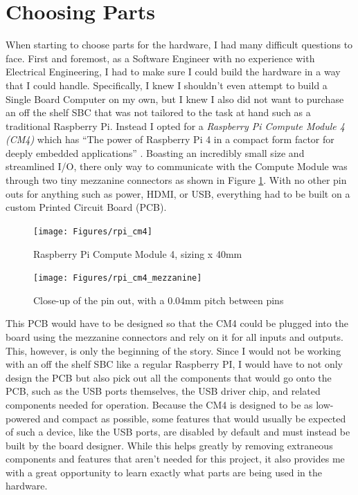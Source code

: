 \section{Choosing Parts}\label{sec:ChoosingParts}

When starting to choose parts for the hardware, I had many difficult questions to face.
First and foremost, as a Software Engineer with no experience with Electrical Engineering, I had to make sure I could build the hardware in a way that I could handle.
Specifically, I knew I shouldn't even attempt to build a Single Board Computer on my own, but I knew I also did not want to purchase an off the shelf SBC that was not tailored to the task at hand such as a traditional Raspberry Pi.
Instead I opted for a \emph{Raspberry Pi Compute Module 4 (CM4)} which has \enquote{The power of Raspberry Pi 4 in a compact form factor for deeply embedded applications} \cite{rpi_cm4}.
Boasting an incredibly small size and streamlined I/O, there only way to communicate with the Compute Module was through two tiny mezzanine connectors as shown in Figure \ref{fig:rpi_cm4_mezzanine}.
With no other pin outs for anything such as power, HDMI, or USB, everything had to be built on a custom Printed Circuit Board (PCB).

\begin{figure}[h]
  \centering
  \begin{minipage}{0.45\textwidth}
    \centering
    \texttt{[image: Figures/rpi\_cm4]}
    \captionsetup{width=.75\linewidth}
    \caption[Raspberry Pi Compute Module 4]{Raspberry Pi Compute Module 4, sizing x 40mm}
    \label{fig:rpi_cm4}
  \end{minipage}\hfill
  \begin{minipage}{0.45\textwidth}
    \centering
    \texttt{[image: Figures/rpi\_cm4\_mezzanine]}
    \captionsetup{width=.75\linewidth}
    \caption[Raspberry Pi Compute Module 4 Pin out]{Close-up of the pin out, with a 0.04mm pitch between pins}
    \label{fig:rpi_cm4_mezzanine}
  \end{minipage}
\end{figure}

This PCB would have to be designed so that the CM4 could be plugged into the board using the mezzanine connectors and rely on it for all inputs and outputs.
This, however, is only the beginning of the story.
Since I would not be working with an off the shelf SBC like a regular Raspberry PI, I would have to not only design the PCB but also pick out all the components that would go onto the PCB, such as the USB ports themselves, the USB driver chip, and related components needed for operation.
Because the CM4 is designed to be as low-powered and compact as possible, some features that would usually be expected of such a device, like the USB ports, are disabled by default and must instead be built by the board designer.
While this helps greatly by removing extraneous components and features that aren't needed for this project, it also provides me with a great opportunity to learn exactly what parts are being used in the hardware.

